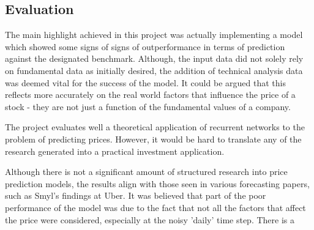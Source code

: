 \documentclass[10pt,onecolumn,letterpaper]{article}
\begin{document}
\subsection{Evaluation} \label{evaluation}

The main highlight achieved in this project was actually implementing a model which showed some signs of signs of outperformance in terms of prediction against the designated benchmark. Although, the input data did not solely rely on fundamental data as initially desired, the addition of technical analysis data was deemed vital for the success of the model. It could be argued that this reflects more accurately on the real world factors that influence the price of a stock - they are not just a function of the fundamental values of a company.

The project evaluates well a theoretical application of recurrent networks to the problem of predicting prices. However, it would be hard to translate any of the research generated into a practical investment application. 

Although there is not a significant amount of structured research into price prediction models, the results align with those seen in various forecasting papers, such as Smyl's findings at Uber. It was believed that part of the poor performance of the model was due to the fact that not all the factors that affect the price were considered, especially at the noisy 'daily' time step. There is a 
\end{document}
